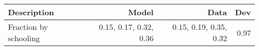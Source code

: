 \begin{tabular}{lrrr}
\hline
Description & Model  & Data  & Dev  \\ 
\hline
Fraction by schooling & 0.15, 0.17, 0.32, 0.36  & 0.15, 0.19, 0.35, 0.32  & 0.97  \\ 
\hline
\end{tabular}%
